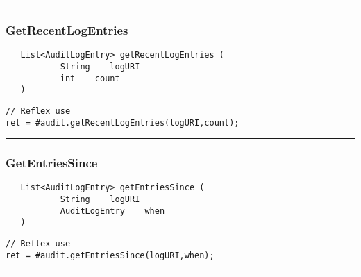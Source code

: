 \rule{15cm}{2pt}
\subsubsection{GetRecentLogEntries}
\label{Api:GetRecentLogEntries}
\begin{verbatim}
   List<AuditLogEntry> getRecentLogEntries (
           String    logURI
           int    count
   )
\end{verbatim}
\begin{lstlisting}[language=reflex]
// Reflex use
ret = #audit.getRecentLogEntries(logURI,count);
\end{lstlisting}



\rule{15cm}{2pt}
\subsubsection{GetEntriesSince}
\label{Api:GetEntriesSince}
\begin{verbatim}
   List<AuditLogEntry> getEntriesSince (
           String    logURI
           AuditLogEntry    when
   )
\end{verbatim}
\begin{lstlisting}[language=reflex]
// Reflex use
ret = #audit.getEntriesSince(logURI,when);
\end{lstlisting}



\rule{15cm}{2pt}
